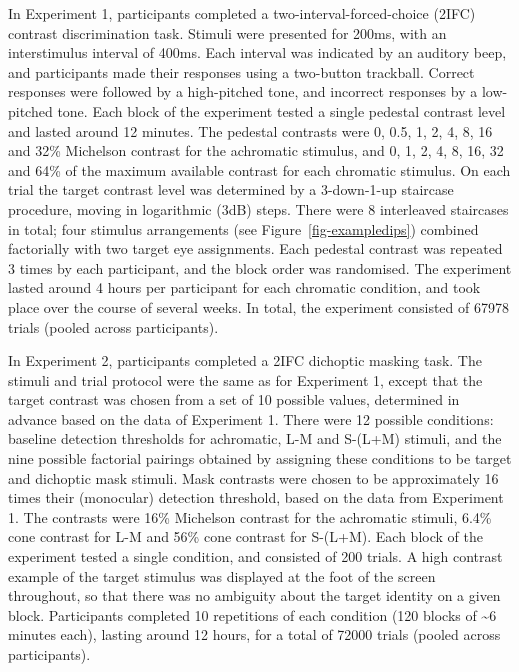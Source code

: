\documentclass[
  letterpaper,
  DIV=11,
  numbers=noendperiod]{scrartcl}
\begin{document}
In Experiment 1, participants completed a two-interval-forced-choice
(2IFC) contrast discrimination task. Stimuli were presented for 200ms,
with an interstimulus interval of 400ms. Each interval was indicated by
an auditory beep, and participants made their responses using a
two-button trackball. Correct responses were followed by a high-pitched
tone, and incorrect responses by a low-pitched tone. Each block of the
experiment tested a single pedestal contrast level and lasted around 12
minutes. The pedestal contrasts were 0, 0.5, 1, 2, 4, 8, 16 and 32\%
Michelson contrast for the achromatic stimulus, and 0, 1, 2, 4, 8, 16,
32 and 64\% of the maximum available contrast for each chromatic
stimulus. On each trial the target contrast level was determined by a
3-down-1-up staircase procedure, moving in logarithmic (3dB) steps.
There were 8 interleaved staircases in total; four stimulus arrangements
(see Figure~\ref{fig-exampledips}) combined factorially with two target
eye assignments. Each pedestal contrast was repeated 3 times by each
participant, and the block order was randomised. The experiment lasted
around 4 hours per participant for each chromatic condition, and took
place over the course of several weeks. In total, the experiment
consisted of 67978 trials (pooled across participants).

In Experiment 2, participants completed a 2IFC dichoptic masking task.
The stimuli and trial protocol were the same as for Experiment 1, except
that the target contrast was chosen from a set of 10 possible values,
determined in advance based on the data of Experiment 1. There were 12
possible conditions: baseline detection thresholds for achromatic, L-M
and S-(L+M) stimuli, and the nine possible factorial pairings obtained
by assigning these conditions to be target and dichoptic mask stimuli.
Mask contrasts were chosen to be approximately 16 times their
(monocular) detection threshold, based on the data from Experiment 1.
The contrasts were 16\% Michelson contrast for the achromatic stimuli,
6.4\% cone contrast for L-M and 56\% cone contrast for S-(L+M). Each
block of the experiment tested a single condition, and consisted of 200
trials. A high contrast example of the target stimulus was displayed at
the foot of the screen throughout, so that there was no ambiguity about
the target identity on a given block. Participants completed 10
repetitions of each condition (120 blocks of \textasciitilde6 minutes
each), lasting around 12 hours, for a total of 72000 trials (pooled
across participants).
\end{document}

